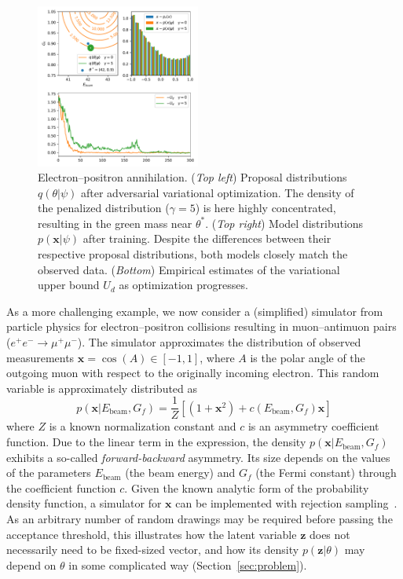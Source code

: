 \documentclass[twocolumn,superscriptaddress,aps]{revtex4-1}
\theoremstyle{plain}
\begin{document}
\begin{figure}
    \centering
    \includegraphics[width=0.48\textwidth]{figures/weinberg.pdf}
    \caption{Electron--positron annihilation.
    ({\it Top left}) Proposal distributions $q(\theta|\psi)$ after adversarial variational optimization. The density of the penalized distribution ($\gamma=5$) is here highly concentrated, resulting in the green mass near $\theta^*$.
    ({\it Top right}) Model distributions $p(\mathbf{x}|\psi)$ after training. Despite the differences between their respective proposal distributions, both models closely match the observed data.
    ({\it Bottom}) Empirical estimates of the variational upper bound $U_d$ as optimization progresses.
             }\label{fig:weinberg}
\end{figure}

As a more challenging example, we now consider a (simplified) simulator from
particle physics for electron--positron collisions resulting in muon--antimuon
pairs ($e^+e^- \rightarrow \mu^+\mu^-$). The simulator approximates the
distribution of observed measurements $\mathbf{x} = \cos(A) \in [-1,1]$, where $A$ is the
polar angle of the outgoing muon with respect  to the originally incoming
electron. This random variable is approximately distributed as
\begin{equation}
    p(\mathbf{x}|E_\text{beam}, G_f) = \frac{1}{Z} \left[ (1 + \mathbf{x}^2) + c(E_\text{beam}, G_f) \mathbf{x} \right]
\end{equation}
where $Z$ is a known normalization constant and $c$ is an asymmetry coefficient
function. Due to the linear term in the expression, the density $p(\mathbf{x} |
E_\text{beam}, G_f)$ exhibits a so-called {\it forward-backward} asymmetry.  Its
size depends on the values of the parameters $E_\text{beam}$ (the beam energy)
and $G_f$ (the Fermi constant) through the coefficient function $c$. Given the
known analytic form of the probability density function, a simulator for
$\mathbf{x}$ can be implemented with rejection sampling~\citep{von195113}. As an
arbitrary number of random drawings may be required before passing the
acceptance threshold, this illustrates how the latent variable
$\mathbf{z}$ does not necessarily need to be fixed-sized vector, and how its
density  $p(\mathbf{z}|\theta)$ may depend on $\theta$ in some complicated way
(Section~\ref{sec:problem}).
\end{document}
